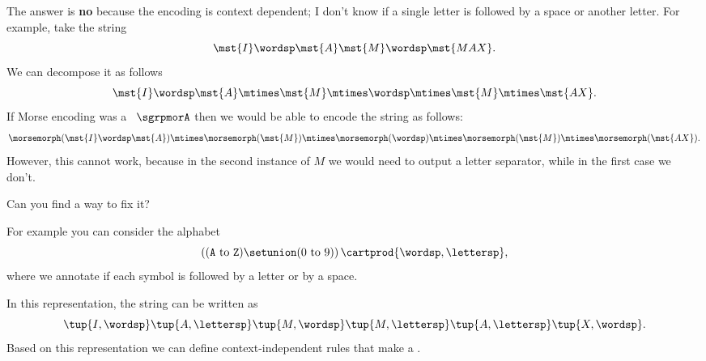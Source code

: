 %
\begin{solution}
	The answer is \textbf{no} because the encoding is context dependent; I don't know if a single letter is followed by a space or another letter.
	For example, take the string
	\begin{equation}
		\label{eq:max-iammax}
		\mst {I} \wordsp \mst{A} \mst{M}\wordsp \mst{MAX}.
	\end{equation}
	We can decompose it as follows
	\begin{equation}
		\label{eq:max-iammax-decomp}
		\mst{I}\wordsp \mst{A}\mtimes \mst{M} \mtimes \wordsp \mtimes \mst{M} \mtimes \mst{AX}.
	\end{equation}
	If Morse encoding was a \whomo~$\sgrpmorA$ then we would be able to encode the string as follows:
	\begin{equation}
		\label{eq:max-iammax-decomp-morph}
		\morsemorph(\mst{I}\wordsp \mst{A}) \mtimes \morsemorph (\mst{M}) \mtimes  \morsemorph(\wordsp) \mtimes  \morsemorph(\mst{M})
		\mtimes  \morsemorph(\mst{AX}).
	\end{equation}
	However, this cannot work, because in the second instance of $M$ we would need to output a letter separator, while in the first case we don't.

	Can you find a way to fix it?

	For example you can consider the alphabet
	\begin{equation}
		\left( (\texttt{A} \ \text{to}\ \texttt{Z}) \setunion (0 \ \text{to}\ 9) \right) \cartprod \{\wordsp, \lettersp\},
	\end{equation}
	where we annotate if each symbol is followed by a letter or by a space.

	In this representation, the string can be written as
	\begin{equation}
		\tup{I, \wordsp} \tup{A, \lettersp} \tup{ M, \wordsp} \tup{M, \lettersp} \tup{A, \lettersp}
		\tup{X, \wordsp}.
	\end{equation}
	Based on this representation we can define context-independent rules that make a \whomo.
\end{solution}


